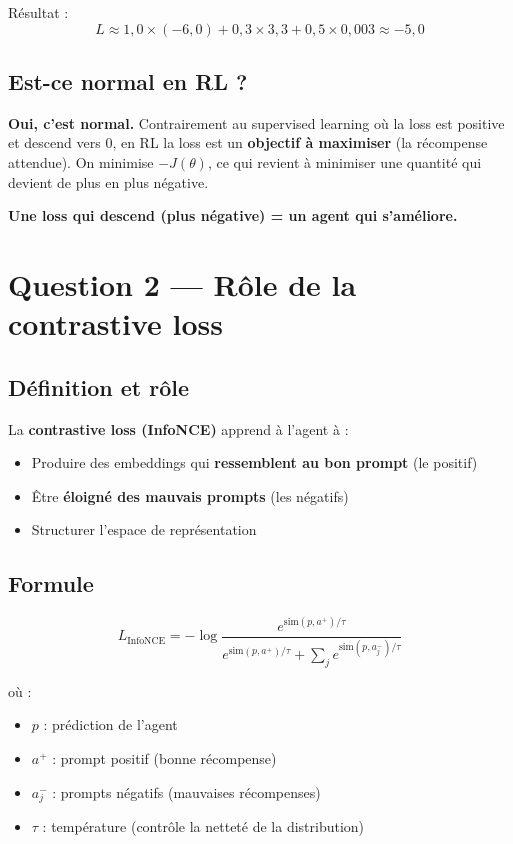 \documentclass[11pt,a4paper]{article}
\begin{document}
Résultat :
\begin{equation}
L \approx 1{,}0 \times (-6{,}0) + 0{,}3 \times 3{,}3 + 0{,}5 \times 0{,}003 \approx -5{,}0
\end{equation}

\subsection{Est-ce normal en RL ?}

\textbf{Oui, c'est normal.} Contrairement au supervised learning où la loss est positive et descend vers 0, en RL la loss est un \textbf{objectif à maximiser} (la récompense attendue). On minimise $-J(\theta)$, ce qui revient à minimiser une quantité qui devient de plus en plus négative.

\textbf{Une loss qui descend (plus négative) = un agent qui s'améliore.}

\section{Question 2 — Rôle de la contrastive loss}

\subsection{Définition et rôle}

La \textbf{contrastive loss (InfoNCE)} apprend à l'agent à :
\begin{itemize}
    \item Produire des embeddings qui \textbf{ressemblent au bon prompt} (le positif)
    \item Être \textbf{éloigné des mauvais prompts} (les négatifs)
    \item Structurer l'espace de représentation
\end{itemize}

\subsection{Formule}

\begin{equation}
L_{\text{InfoNCE}} = -\log \frac{e^{\text{sim}(p, a^+)/\tau}}{e^{\text{sim}(p, a^+)/\tau} + \sum_j e^{\text{sim}(p, a^-_j)/\tau}}
\end{equation}

où :
\begin{itemize}
    \item $p$ : prédiction de l'agent
    \item $a^+$ : prompt positif (bonne récompense)
    \item $a^-_j$ : prompts négatifs (mauvaises récompenses)
    \item $\tau$ : température (contrôle la netteté de la distribution)
\end{itemize}
\end{document}

